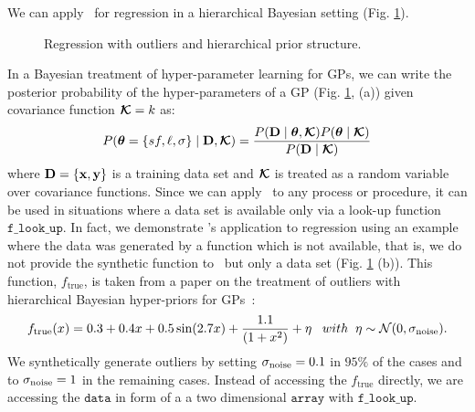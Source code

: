 We can apply \gpmem\ for regression in a hierarchical Bayesian setting
(Fig. \ref{fig:neal_tutorial}).  
\begin{figure}

\caption{\footnotesize Regression with outliers and hierarchical prior
structure.}
\label{fig:neal_tutorial}
\end{figure}
In a Bayesian treatment of  hyper-parameter learning for \ac{GP}s,
we can write the posterior probability of the hyper-parameters of a GP  (Fig.
\ref{fig:neal_tutorial}, (a)) given covariance function $\bm{\mathcal{K}}=k$ as:
\begin{equation}
\label{eq:hyperProbability}
P(\bm{\theta}=\{sf,\ell,\sigma\} \mid \mathbf{D},\bm{\mathcal{K}} ) = \frac{P(\mathbf{D} \mid
\bm{\theta}, \bm{\mathcal{K}})P(\bm{\theta} \mid \bm{\mathcal{K}}) }{P(\mathbf{D} \mid
\bm{\mathcal{K}})}
\end{equation}
where $\mathbf{D} = \{\mathbf{x}, \mathbf{y}\}$ is a training data set and $\bm{\mathcal{K}}$ is treated
as a random variable over covariance functions. Since we can apply
\gpmem\ to any process or procedure, it can be used in situations where a data
set is available only via a look-up function $\texttt{f\_look\_up}$.
In fact, we demonstrate \gpmem's application to regression using an example where
the data was generated by a function which is not available, that is, we do not
provide the synthetic function to \gpmem\ but only a data set (Fig.
\ref{fig:neal_tutorial} (b)).
This function, $f_\text{true}$, is taken from a paper on the
treatment of outliers with hierarchical Bayesian hyper-priors for
\ac{GP}s~\citep{neal1997monte}:
\begin{equation}
f_\text{true}(x) =  0.3 + 0.4 x + 0.5 \sin(2.7x) + \frac{1.1}{(1+ x^2)} + \eta
\;\;\; with\;\;\eta \sim \mathcal{N}(0,\sigma_{\text{noise}}).
\end{equation}
We synthetically generate outliers by setting $\sigma_{\text{noise}} = 0.1$ in $95\%$ of
the cases and to $\sigma_{\text{noise}} = 1$ in the remaining cases. 
Instead of accessing the $f_\text{true}$ directly, we are accessing the $\texttt{data}$ in form of
a a two dimensional $\texttt{array}$ with $\texttt{f\_look\_up}$.

